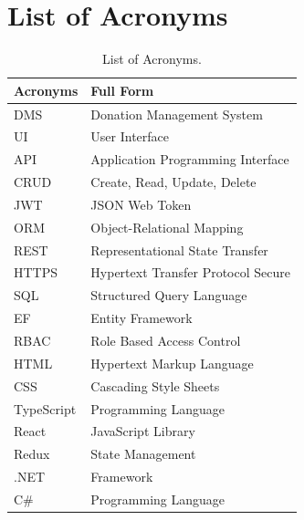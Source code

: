 \documentclass{thesis-library}
\begin{document}
\chapter*{List of Acronyms}
\vspace{-40pt}
\begin{table}[h]
    \renewcommand{\arraystretch}{1.6}
    \centering
    \caption*{List of Acronyms.}
    \vspace{10pt}
    \begin{tabularx}{\linewidth}{|l|L|}
        \hline
        \textbf{Acronyms} & \textbf{Full Form} \\
        \hline
        DMS & Donation Management System\\
        UI & User Interface\\
        API & Application Programming Interface\\
        CRUD & Create, Read, Update, Delete\\
        JWT & JSON Web Token\\
        ORM & Object-Relational Mapping\\
        REST & Representational State Transfer\\
        HTTPS & Hypertext Transfer Protocol Secure\\
        SQL & Structured Query Language\\
        EF & Entity Framework\\
        RBAC & Role Based Access Control\\
        HTML & Hypertext Markup Language\\
        CSS & Cascading Style Sheets\\
        TypeScript & Programming Language\\
        React & JavaScript Library\\
        Redux & State Management\\
        .NET & Framework\\
        C\# & Programming Language\\
        \hline
    \end{tabularx}
\end{table}
\end{document}
